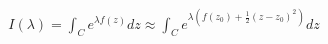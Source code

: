 \documentclass[preview]{standalone}
\begin{document}
\begin{align*}
I(\lambda) = \displaystyle \int_C e^{\lambda f(z)}dz \approx \displaystyle \int_C e^{\lambda (f(z_0)+\frac{1}{2}(z-z_0)^2)}dz
\end{align*}
\end{document}
